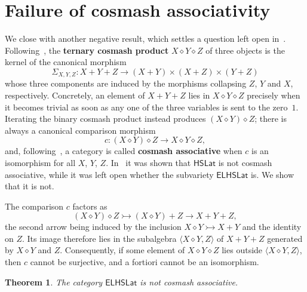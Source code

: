 \documentclass[reqno,a4paper]{amsart}
\newtheorem{theorem}[lemma]{Theorem}
\theoremstyle{remark}
\theoremstyle{definition}
\newcommand{\defn}{\textbf}
\newcommand{\HSLat}{\ensuremath{\mathsf{HSLat}}}
\newcommand{\ELHSLat}{\ensuremath{\mathsf{ELHSLat}}}
\begin{document}
\section{Failure of cosmash associativity}\label{section cosmash}

We close with another negative result, which settles a question left open in~\cite{HSLat}. Following~\cite{Smash,HVdL}, the \defn{ternary cosmash product} \(X\diamond Y\diamond Z\) of three objects is the kernel of the canonical morphism
\[
	\Sigma_{X,Y,Z}\colon X+Y+Z \longrightarrow (X+Y)\times(X+Z)\times(Y+Z)
\]
whose three components are induced by the morphisms collapsing \(Z\), \(Y\) and \(X\), respectively. Concretely, an element of \(X+Y+Z\) lies in \(X\diamond Y\diamond Z\) precisely when it becomes trivial as soon as any one of the three variables is sent to the zero~\(1\). Iterating the binary cosmash product instead produces \((X\diamond Y)\diamond Z\); there is always a canonical comparison morphism
\[
	c\colon (X\diamond Y)\diamond Z \longrightarrow X\diamond Y\diamond Z,
\]
and, following~\cite{Cosmash}, a category is called \defn{cosmash associative} when \(c\) is an isomorphism for all \(X\), \(Y\), \(Z\). In~\cite{HSLat} it was shown that \(\HSLat\) is not cosmash associative, while it was left open whether the subvariety \(\ELHSLat\) is. We show that it is not.

The comparison \(c\) factors as
\[
	(X\diamond Y)\diamond Z \rightarrowtail (X\diamond Y)+Z \longrightarrow X+Y+Z,
\]
the second arrow being induced by the inclusion \(X\diamond Y\rightarrowtail X+Y\) and the identity on \(Z\). Its image therefore lies in the subalgebra \(\langle X\diamond Y, Z\rangle\) of \(X+Y+Z\) generated by \(X\diamond Y\) and \(Z\). Consequently, if some element of \(X\diamond Y\diamond Z\) lies outside \(\langle X\diamond Y, Z\rangle\), then \(c\) cannot be surjective, and a fortiori cannot be an isomorphism.

\begin{theorem}\label{theorem not cosmash}
	The category \(\ELHSLat\) is not cosmash associative.
\end{theorem}
\end{document}
